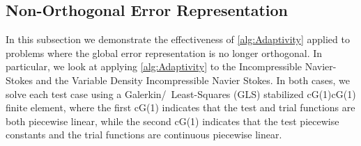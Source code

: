 \subsection{Non-Orthogonal Error Representation}
In this subsection we demonstrate the effectiveness of \autoref{alg:Adaptivity}
applied to problems where the global error representation is no longer
orthogonal. In particular, we look at applying \autoref{alg:Adaptivity} to the
Incompressible Navier-Stokes and the Variable Density Incompressible Navier
Stokes. In both cases, we solve each test case using a
Galerkin\slash~Least-Squares (GLS) stabilized cG(1)cG(1) finite element, where
the first cG(1) indicates that the test and trial functions are both piecewise
linear, while the second cG(1) indicates that the test piecewise constants and
the trial functions are continuous piecewise linear.

